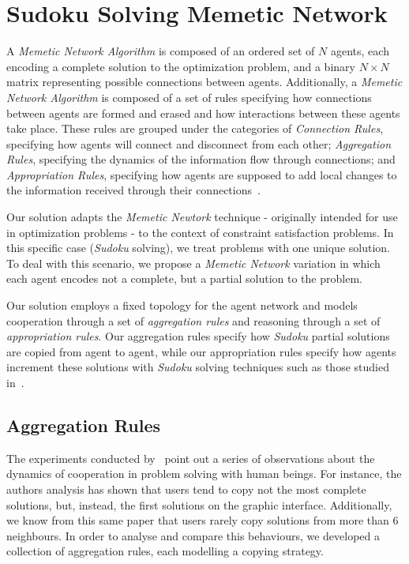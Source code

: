 \documentclass[letterpaper]{article}
\begin{document}
\section{Sudoku Solving Memetic Network}
 
A {\em Memetic Network Algorithm} is composed of an ordered set of $N$ agents, each encoding a complete solution to the optimization problem, and a binary $N \times N$ matrix representing possible connections between agents. Additionally, a {\em Memetic Network Algorithm} is composed of a set of rules specifying how connections between agents are formed and erased and how interactions between these agents take place. These rules are grouped under the categories of {\em Connection Rules}, specifying how agents will connect and disconnect from each other; {\em Aggregation Rules}, specifying the dynamics of the information flow through connections; and {\em Appropriation Rules}, specifying how agents are supposed to add local changes to the information received through their connections~\cite{lamb:memenet}.

Our solution adapts the {\em Memetic Newtork} technique - originally intended for use in optimization problems - to the context of constraint satisfaction problems. In this specific case ({\em Sudoku} solving), we treat problems with one unique solution. To deal with this scenario, we propose a {\em Memetic Network} variation in which each agent encodes not a complete, but a partial solution to the problem.

Our solution employs a fixed topology for the agent network and models cooperation through a set of {\em aggregation rules} and reasoning through a set of {\em appropriation rules}. Our aggregation rules specify how {\em Sudoku} partial solutions are copied from agent to agent, while our appropriation rules specify how agents increment these solutions with {\em Sudoku} solving techniques such as those studied in~\cite{davis:mathsudoku}.

\subsection{Aggregation Rules}

The experiments conducted by~\cite{farenzena:collabem} point out a series of observations about the dynamics of cooperation in problem solving with human beings. For instance, the authors analysis has shown that users tend to copy not the most complete solutions, but, instead, the first solutions on the graphic interface. Additionally, we know from this same paper that users rarely copy solutions from more than 6 neighbours. In order to analyse and compare this behaviours, we developed a collection of aggregation rules, each modelling a copying strategy.
\end{document}
